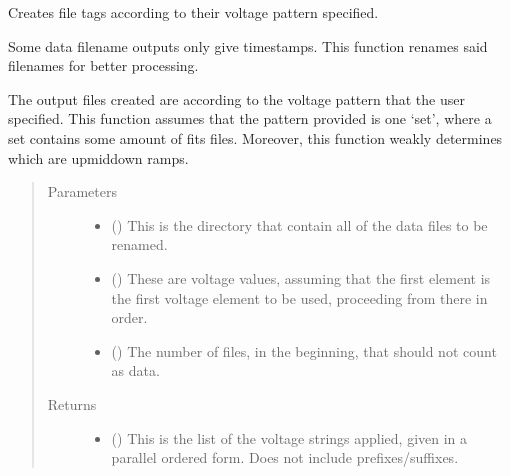 \documentclass[letterpaper,10pt,english]{sphinxmanual}
\begin{document}

\begin{fulllineitems}
\label{\detokenize{docstrings/ifa_smeargle.reformat.renaming:ifa_smeargle.reformat.renaming.rename_voltage_pattern}}
Creates file tags according to their voltage pattern
specified.

Some data filename outputs only give timestamps. This function
renames said filenames for better processing.

The output files created are according to the voltage pattern
that the user specified. This function assumes that the pattern
provided is one ‘set’, where a set contains some amount of fits
files. Moreover, this function weakly determines which are
up\sphinxhyphen{}mid\sphinxhyphen{}down ramps.
\begin{quote}\begin{description}
\item[{Parameters}] \leavevmode\begin{itemize}
\item {} 
 () \textendash{} This is the directory that contain all of the data files
to be renamed.

\item {} 
 () \textendash{} These are voltage values, assuming that the first element
is the first voltage element to be used, proceeding from
there in order.

\item {} 
 (\sphinxstyleliteralemphasis{\sphinxupquote{ (}}\sphinxstyleliteralemphasis{\sphinxupquote{)}}) \textendash{} The number of files, in the beginning, that should not count
as data.

\end{itemize}

\item[{Returns}] \leavevmode
\begin{itemize}
\item {} 
 () \textendash{} This is the list of the voltage strings applied, given in
a parallel ordered form. Does not include prefixes/suffixes.


\end{itemize}
\end{description}
\end{quote}
\end{fulllineitems}
\end{document}
